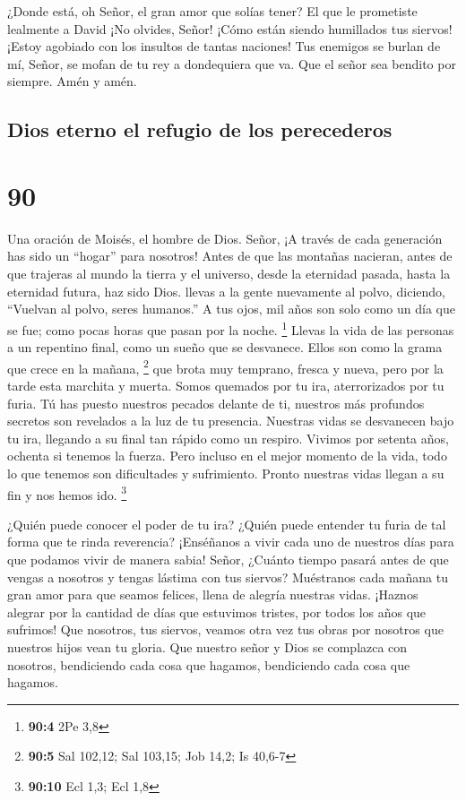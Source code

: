 ¿Donde está, oh Señor, el gran amor que solías tener? El
que le prometiste lealmente a David  ¡No olvides, Señor!
¡Cómo están siendo humillados tus siervos! ¡Estoy agobiado con los
insultos de tantas naciones!  Tus enemigos se burlan de mí,
Señor, se mofan de tu rey a dondequiera que va.  Que el
señor sea bendito por siempre. Amén y amén.

\hypertarget{dios-eterno-el-refugio-de-los-perecederos}{%
\subsection{Dios eterno el refugio de los
perecederos}\label{dios-eterno-el-refugio-de-los-perecederos}}

\hypertarget{section-89}{%
\section{90}\label{section-89}}

Una oración de Moisés, el hombre de Dios.  Señor, ¡A través
de cada generación has sido un ``hogar'' para nosotros! 
Antes de que las montañas nacieran, antes de que trajeras al mundo la
tierra y el universo, desde la eternidad pasada, hasta la eternidad
futura, haz sido Dios.  llevas a la gente nuevamente al
polvo, diciendo, ``Vuelvan al polvo, seres humanos.''  A tus
ojos, mil años son solo como un día que se fue; como pocas horas que
pasan por la noche. \footnote{\textbf{90:4} 2Pe 3,8}  Llevas
la vida de las personas a un repentino final, como un sueño que se
desvanece. Ellos son como la grama que crece en la mañana, \footnote{\textbf{90:5}
  Sal 102,12; Sal 103,15; Job 14,2; Is 40,6-7}  que brota
muy temprano, fresca y nueva, pero por la tarde esta marchita y muerta.
 Somos quemados por tu ira, aterrorizados por tu furia.
 Tú has puesto nuestros pecados delante de ti, nuestros más
profundos secretos son revelados a la luz de tu presencia. 
Nuestras vidas se desvanecen bajo tu ira, llegando a su final tan rápido
como un respiro.  Vivimos por setenta años, ochenta si
tenemos la fuerza. Pero incluso en el mejor momento de la vida, todo lo
que tenemos son dificultades y sufrimiento. Pronto nuestras vidas llegan
a su fin y nos hemos ido. \footnote{\textbf{90:10} Ecl 1,3; Ecl 1,8}

 ¿Quién puede conocer el poder de tu ira? ¿Quién puede
entender tu furia de tal forma que te rinda reverencia? 
¡Enséñanos a vivir cada uno de nuestros días para que podamos vivir de
manera sabia!  Señor, ¿Cuánto tiempo pasará antes de que
vengas a nosotros y tengas lástima con tus siervos? 
Muéstranos cada mañana tu gran amor para que seamos felices, llena de
alegría nuestras vidas.  ¡Haznos alegrar por la cantidad de
días que estuvimos tristes, por todos los años que sufrimos!
 Que nosotros, tus siervos, veamos otra vez tus obras por
nosotros que nuestros hijos vean tu gloria.  Que nuestro
señor y Dios se complazca con nosotros, bendiciendo cada cosa que
hagamos, bendiciendo cada cosa que hagamos.

